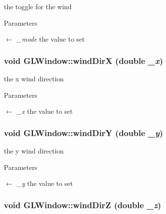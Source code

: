 the toggle for the wind 
\begin{DoxyParams}{Parameters}
\item[\mbox{$\leftarrow$} {\em \_\-mode}]the value to set \end{DoxyParams}
\hypertarget{classGLWindow_a626fbb233dd4a880023fafd167ec64f6}{
\subsubsection[{windDirX}]{\setlength{\rightskip}{0pt plus 5cm}void GLWindow::windDirX (double {\em \_\-x})}}
\label{classGLWindow_a626fbb233dd4a880023fafd167ec64f6}


the x wind direction 
\begin{DoxyParams}{Parameters}
\item[\mbox{$\leftarrow$} {\em \_\-x}]the value to set \end{DoxyParams}
\hypertarget{classGLWindow_acb067f37bf1e0756352b02f8674e3d41}{
\subsubsection[{windDirY}]{\setlength{\rightskip}{0pt plus 5cm}void GLWindow::windDirY (double {\em \_\-y})}}
\label{classGLWindow_acb067f37bf1e0756352b02f8674e3d41}


the y wind direction 
\begin{DoxyParams}{Parameters}
\item[\mbox{$\leftarrow$} {\em \_\-y}]the value to set \end{DoxyParams}
\hypertarget{classGLWindow_a06407e4c5767e7aa5488974929a1a2aa}{
\subsubsection[{windDirZ}]{\setlength{\rightskip}{0pt plus 5cm}void GLWindow::windDirZ (double {\em \_\-z})}}
\label{classGLWindow_a06407e4c5767e7aa5488974929a1a2aa}



